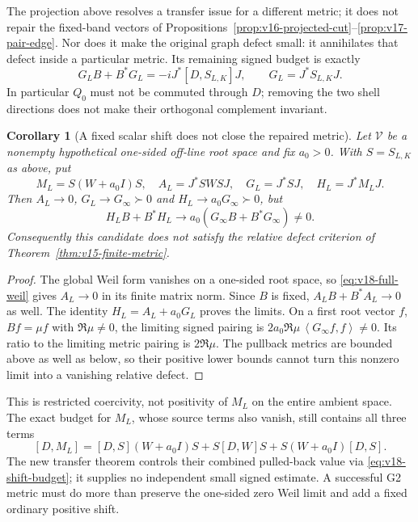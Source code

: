 \documentclass[11pt]{article}
\newtheorem{corollary}[theorem]{Corollary}
\theoremstyle{remark}
\newcommand{\ip}[2]{\left\langle #1,#2\right\rangle}
\begin{document}
The projection above resolves a transfer issue for a different metric;
it does not repair the fixed-band vectors of
Propositions~\ref{prop:v16-projected-cut}--\ref{prop:v17-pair-edge}.
Nor does it make the original graph defect small: it annihilates that
defect inside a particular metric. Its remaining signed budget is exactly
\begin{equation}\label{eq:v18-full-budget}
 G_LB+B^*G_L=-iJ^*[D,S_{L,K}]J,\qquad G_L=J^*S_{L,K}J.
\end{equation}
In particular $Q_0$ must not be commuted through $D$; removing the
two shell directions does not make their orthogonal complement invariant.

\begin{corollary}[A fixed scalar shift does not close the repaired metric]
\label{cor:v18-shift}
Let $\mathcal V$ be a nonempty hypothetical one-sided off-line root
space and fix $a_0>0$. With $S=S_{L,K}$ as above, put
\[
 M_L=S(W+a_0I)S,\quad A_L=J^*SWSJ,\quad
 G_L=J^*SJ,\quad H_L=J^*M_LJ.
\]
Then $A_L\to0$, $G_L\to G_\infty\succ0$ and
$H_L\to a_0G_\infty\succ0$, but
\begin{equation}\label{eq:v18-shift-budget}
 H_LB+B^*H_L\longrightarrow
                  a_0(G_\infty B+B^*G_\infty)\ne0.
\end{equation}
Consequently this candidate does not satisfy the relative defect
criterion of Theorem~\ref{thm:v15-finite-metric}.
\end{corollary}
\begin{proof}
The global Weil form vanishes on a one-sided root space, so
\eqref{eq:v18-full-weil} gives $A_L\to0$ in its finite matrix norm.
Since $B$ is fixed, $A_LB+B^*A_L\to0$ as well. The identity
$H_L=A_L+a_0G_L$ proves the limits. On a first root vector $f$,
$Bf=\mu f$ with $\Re\mu\ne0$, the limiting signed pairing is
$2a_0\Re\mu\,\ip{G_\infty f}{f}\ne0$. Its ratio to the
limiting metric pairing is $2\Re\mu$. The pullback metrics are
bounded above as well as below, so their positive lower bounds cannot
turn this nonzero limit into a vanishing relative defect.
\end{proof}

This is restricted coercivity, not positivity of $M_L$ on the entire
ambient space. The exact budget for $M_L$, whose source terms also
vanish, still contains all three terms
\[
 [D,M_L]=[D,S](W+a_0I)S+S[D,W]S+S(W+a_0I)[D,S].
\]
The new transfer theorem controls their combined pulled-back value via
\eqref{eq:v18-shift-budget}; it supplies no independent small signed
estimate. A successful G2 metric must do more than preserve the
one-sided zero Weil limit and add a fixed ordinary positive shift.
\end{document}
